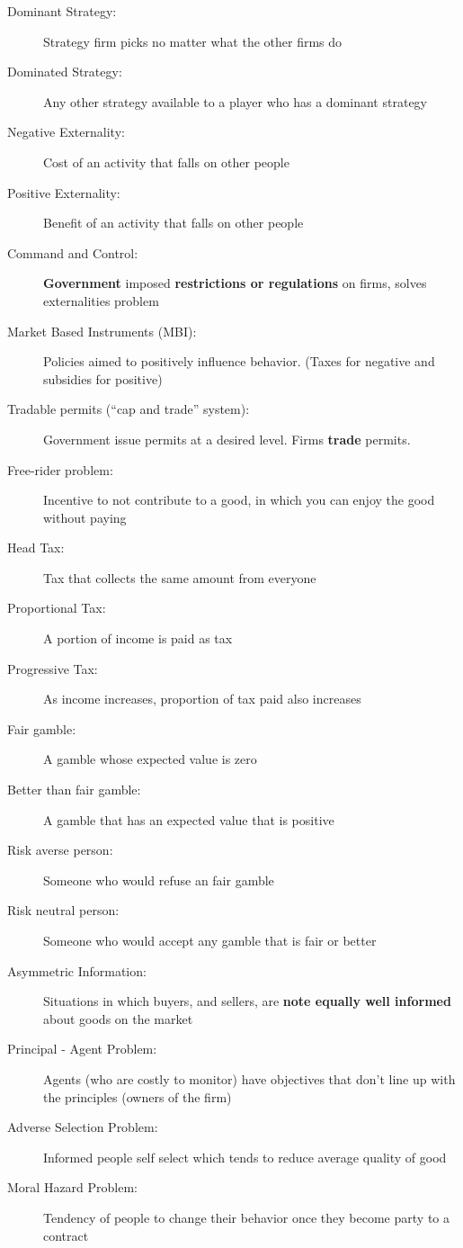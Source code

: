 \begin{description}
	\item[Dominant Strategy:] Strategy firm picks no matter what the other firms do
	\item[Dominated Strategy:] Any other strategy available to a player who has a dominant strategy
	\item[Negative Externality:] Cost of an activity that falls on other people
	\item[Positive Externality:] Benefit of an activity that falls on other people
	\item[Command and Control:] \textbf{Government} imposed \textbf{restrictions or regulations} on firms, solves externalities problem
	\item[Market Based Instruments (MBI):] Policies aimed to positively influence behavior. (Taxes for negative and subsidies for positive)
	\item[Tradable permits (``cap and trade'' system):] Government issue permits at a desired level. Firms \textbf{trade} permits.
	\item[Free-rider problem:] Incentive to not contribute to a good, in which you can enjoy the good without paying
	\item[Head Tax:] Tax that collects the same amount from everyone
	\item[Proportional Tax:] A portion of income is paid as tax
	\item[Progressive Tax:] As income increases, proportion of tax paid also increases
	\item[Fair gamble:] A gamble whose expected value is zero
	\item[Better than fair gamble:] A gamble that has an expected value that is positive
	\item[Risk averse person:] Someone who would refuse an fair gamble
	\item[Risk neutral person:] Someone who would accept any gamble that is fair or better
	\item[Asymmetric Information:] Situations in which buyers, and sellers, are \textbf{note equally well informed} about goods on the market
	\item[Principal - Agent Problem:] Agents (who are costly to monitor) have objectives that don't line up with the principles (owners of the firm)
	\item[Adverse Selection Problem:] Informed people self select which tends to reduce average quality of good
	\item[Moral Hazard Problem:] Tendency of people to change their behavior once they become party to a contract
\end{description}

